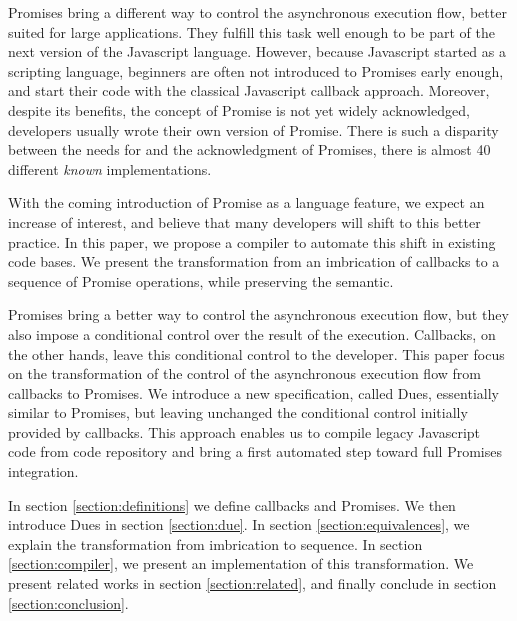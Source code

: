 Promises bring a different way to control the asynchronous execution flow, better suited for large applications.
They fulfill this task well enough to be part of the next version of the Javascript language.
However, because Javascript started as a scripting language, beginners are often not introduced to Promises early enough, and start their code with the classical Javascript callback approach.
Moreover, despite its benefits, the concept of Promise is not yet widely acknowledged, developers usually wrote their own version of Promise.
There is such a disparity between the needs for and the acknowledgment of Promises, there is almost 40 different \textit{known} implementations.

With the coming introduction of Promise as a language feature, we expect an increase of interest, and believe that many developers will shift to this better practice.
In this paper, we propose a compiler to automate this shift in existing code bases.
We present the transformation from an imbrication of callbacks to a sequence of Promise operations, while preserving the semantic.

Promises bring a better way to control the asynchronous execution flow, but they also impose a conditional control over the result of the execution.
Callbacks, on the other hands, leave this conditional control to the developer.
This paper focus on the transformation of the control of the asynchronous execution flow from callbacks to Promises.
We introduce a new specification, called Dues, essentially similar to Promises, but leaving unchanged the conditional control initially provided by callbacks.
This approach enables us to compile legacy Javascript code from code repository and bring a first automated step toward full Promises integration.

In section \ref{section:definitions} we define callbacks and Promises.
We then introduce Dues in section \ref{section:due}.
In section \ref{section:equivalences}, we explain the transformation from imbrication to sequence.
In section \ref{section:compiler}, we present an implementation of this transformation.
We present related works in section \ref{section:related}, and finally conclude in section \ref{section:conclusion}.